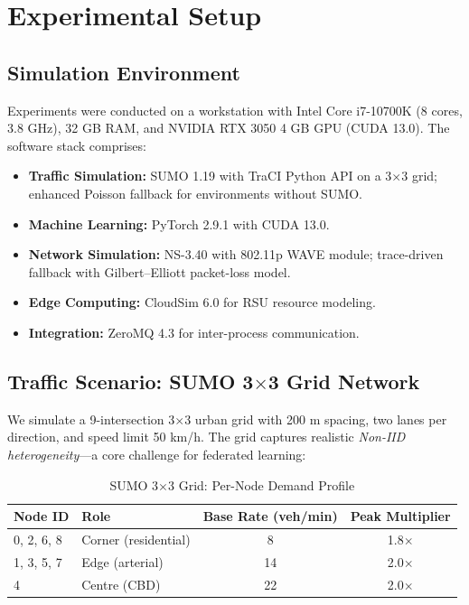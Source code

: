 \documentclass[conference]{IEEEtran}
\begin{document}
\section{Experimental Setup}

\subsection{Simulation Environment}
Experiments were conducted on a workstation with Intel Core i7-10700K (8 cores, 3.8 GHz), 32 GB RAM, and NVIDIA RTX 3050 4 GB GPU (CUDA 13.0). The software stack comprises:

\begin{itemize}
    \item \textbf{Traffic Simulation:} SUMO 1.19 \cite{lopez2018sumo} with TraCI Python API on a 3$\times$3 grid; enhanced Poisson fallback \cite{hcm2000} for environments without SUMO.
    \item \textbf{Machine Learning:} PyTorch 2.9.1 with CUDA 13.0.
    \item \textbf{Network Simulation:} NS-3.40 with 802.11p WAVE module; trace-driven fallback with Gilbert--Elliott packet-loss model.
    \item \textbf{Edge Computing:} CloudSim 6.0 for RSU resource modeling.
    \item \textbf{Integration:} ZeroMQ 4.3 for inter-process communication.
\end{itemize}

\subsection{Traffic Scenario: SUMO 3$\times$3 Grid Network}
We simulate a 9-intersection 3$\times$3 urban grid with 200 m spacing, two lanes per direction, and speed limit 50 km/h. The grid captures realistic \emph{Non-IID heterogeneity}---a core challenge for federated learning:

\begin{table}[htbp]
\caption{SUMO 3$\times$3 Grid: Per-Node Demand Profile}
\label{tab:traffic_config}
\centering
\begin{tabular}{llcc}
\toprule
\textbf{Node ID} & \textbf{Role} & \textbf{Base Rate (veh/min)} & \textbf{Peak Multiplier} \\
\midrule
0, 2, 6, 8 & Corner (residential) & 8  & 1.8$\times$ \\
1, 3, 5, 7 & Edge (arterial)      & 14 & 2.0$\times$ \\
4           & Centre (CBD)         & 22 & 2.0$\times$ \\
\bottomrule
\end{tabular}
\end{table}
\end{document}
